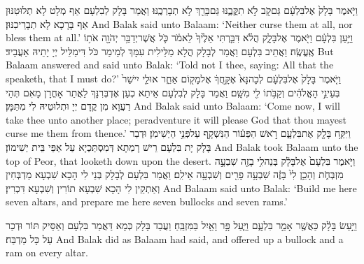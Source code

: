 {וַיֹּ֤אמֶר בָּלָק֙ אֶל\maqqaf בִּלְעָ֔ם גַּם\maqqaf קֹ֖ב לֹ֣א תִקֳּבֶ֑נּוּ גַּם\maqqaf בָּרֵ֖ךְ לֹ֥א תְבָרְכֶֽנּוּ׃}
{וַאֲמַר בָּלָק לְבִלְעָם אַף מְלָט לָא תְלוּטִנּוּן אַף בָּרָכָא לָא תְבָרֵיכִנּוּן׃}
{And Balak said unto Balaam: ‘Neither curse them at all, nor bless them at all.’}{}
{וַיַּ֣עַן בִּלְעָ֔ם וַיֹּ֖אמֶר אֶל\maqqaf בָּלָ֑ק הֲלֹ֗א דִּבַּ֤רְתִּי אֵלֶ֙יךָ֙ לֵאמֹ֔ר כֹּ֛ל אֲשֶׁר\maqqaf יְדַבֵּ֥ר יְהֹוָ֖ה אֹת֥וֹ אֶֽעֱשֶֽׂה׃}
{וַאֲתֵיב בִּלְעָם וַאֲמַר לְבָלָק הֲלָא מַלֵּילִית עִמָּךְ לְמֵימַר כֹּל דִּימַלֵּיל יְיָ יָתֵיהּ אַעֲבֵיד׃}
{But Balaam answered and said unto Balak: ‘Told not I thee, saying: All that the \lord\space speaketh, that I must do?’}{}
{וַיֹּ֤אמֶר בָּלָק֙ אֶל\maqqaf בִּלְעָ֔ם לְכָה\maqqaf נָּא֙ אֶקָּ֣חֲךָ֔ אֶל\maqqaf מָק֖וֹם אַחֵ֑ר אוּלַ֤י יִישַׁר֙ בְּעֵינֵ֣י הָאֱלֹהִ֔ים וְקַבֹּ֥תוֹ לִ֖י מִשָּֽׁם׃}
{וַאֲמַר בָּלָק לְבִלְעָם אֵיתַא כְעַן אֶדְבְּרִנָּךְ לַאֲתַר אָחֳרָן מָאִם תְּהֵי רַעֲוָא מִן קֳדָם יְיָ וּתְלוּטֵיהּ לִי מִתַּמָּן׃}
{And Balak said unto Balaam: ‘Come now, I will take thee unto another place; peradventure it will please God that thou mayest curse me them from thence.’}{}
{וַיִּקַּ֥ח בָּלָ֖ק אֶת\maqqaf בִּלְעָ֑ם רֹ֣אשׁ הַפְּע֔וֹר הַנִּשְׁקָ֖ף עַל\maqqaf פְּנֵ֥י הַיְשִׁימֹֽן׃}
{וּדְבַר בָּלָק יָת בִּלְעָם רֵישׁ רָמְתָא דְּמִסְתַּכְיָא עַל אַפֵּי בֵּית יְשִׁימוֹן׃}
{And Balak took Balaam unto the top of Peor, that looketh down upon the desert.}{}
{וַיֹּ֤אמֶר בִּלְעָם֙ אֶל\maqqaf בָּלָ֔ק בְּנֵה\maqqaf לִ֥י בָזֶ֖ה שִׁבְעָ֣ה מִזְבְּחֹ֑ת וְהָכֵ֥ן לִי֙ בָּזֶ֔ה שִׁבְעָ֥ה פָרִ֖ים וְשִׁבְעָ֥ה אֵילִֽם׃}
{וַאֲמַר בִּלְעָם לְבָלָק בְּנֵי לִי הָכָא שִׁבְעָא מַדְבְּחִין וְאַתְקֵין לִי הָכָא שִׁבְעָא תוֹרִין וְשִׁבְעָא דִּכְרִין׃}
{And Balaam said unto Balak: ‘Build me here seven altars, and prepare me here seven bullocks and seven rams.’}{}

{וַיַּ֣עַשׂ בָּלָ֔ק כַּאֲשֶׁ֖ר אָמַ֣ר בִּלְעָ֑ם וַיַּ֛עַל פָּ֥ר וָאַ֖יִל בַּמִּזְבֵּֽחַ׃}
{וַעֲבַד בָּלָק כְּמָא דַּאֲמַר בִּלְעָם וְאַסֵּיק תּוֹר וּדְכַר עַל כָּל מַדְבַּח׃}
{And Balak did as Balaam had said, and offered up a bullock and a ram on every altar.}{}

